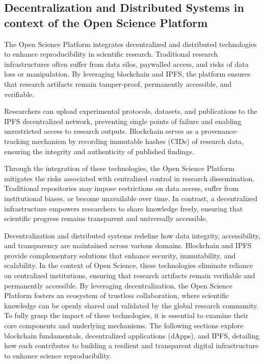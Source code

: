 \documentclass[final]{rc-book-2.14}
\begin{document}
\subsection{Decentralization and Distributed Systems in context of the Open Science Platform}

The Open Science Platform integrates decentralized and distributed technologies to enhance reproducibility in scientific research. Traditional research infrastructures often suffer from data silos, paywalled access, and risks of data loss or manipulation. By leveraging blockchain and IPFS, the platform ensures that research artifacts remain tamper-proof, permanently accessible, and verifiable.

Researchers can upload experimental protocols, datasets, and publications to the IPFS decentralized network, preventing single points of failure and enabling unrestricted access to research outputs. Blockchain serves as a provenance-tracking mechanism by recording immutable hashes (CIDs) of research data, ensuring the integrity and authenticity of published findings.

Through the integration of these technologies, the Open Science Platform mitigates the risks associated with centralized control in research dissemination. Traditional repositories may impose restrictions on data access, suffer from institutional biases, or become unavailable over time. In contrast, a decentralized infrastructure empowers researchers to share knowledge freely, ensuring that scientific progress remains transparent and universally accessible.

Decentralization and distributed systems redefine how data integrity, accessibility, and transparency are maintained across various domains. Blockchain and IPFS provide complementary solutions that enhance security, immutability, and scalability. In the context of Open Science, these technologies eliminate reliance on centralized institutions, ensuring that research artifacts remain verifiable and permanently accessible. By leveraging decentralization, the Open Science Platform fosters an ecosystem of trustless collaboration, where scientific knowledge can be openly shared and validated by the global research community. To fully grasp the impact of these technologies, it is essential to examine their core components and underlying mechanisms. The following sections explore blockchain fundamentals, decentralized applications (dApps), and IPFS, detailing how each contributes to building a resilient and transparent digital infrastructure to enhance science reproducibility.
\end{document}
